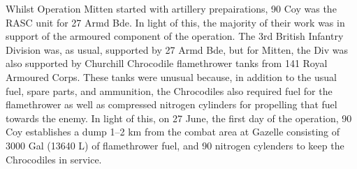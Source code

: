 \documentclass[noraggedright]{turabian-researchpaper}
\begin{document}


		
Whilst Operation Mitten started with artillery prepairations, 90 Coy was the
RASC unit for 27 Armd Bde.  In light of this, the majority of their 
work was in support of the armoured component of the operation.  The 3rd
British Infantry Division was, as usual, supported by 27 Armd Bde, but for
Mitten, the Div was also supported by Churchill Chrocodile flamethrower tanks
from 141 Royal Armoured Corps.  These tanks were unusual because, in addition
to the usual fuel, spare parts, and ammunition, the Chrocodiles also required
fuel for the flamethrower as well as compressed nitrogen cylinders for 
propelling that fuel towards the enemy.  In light of this, on 27 June, the 
first day of the operation, 90 Coy establishes
a dump 1--2 km from the combat area at Gazelle consisting of 3000 Gal (13640 L)
of flamethrower fuel, and 90 nitrogen cylenders to keep the Chrocodiles in
service.\autocite[27 June 1944]{90wd}
\end{document}
